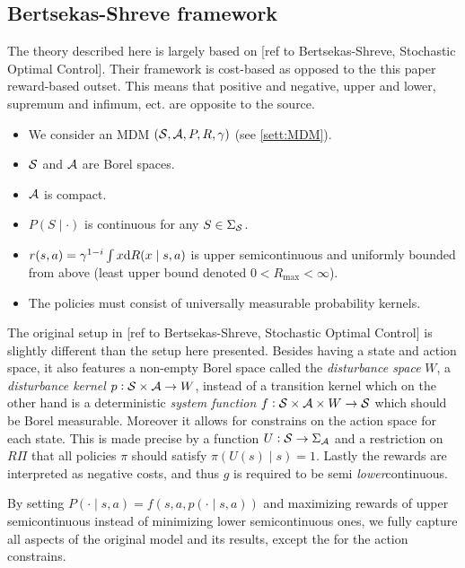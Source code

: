 \subsection{Bertsekas-Shreve framework}
The theory described here is largely based on
[ref to Bertsekas-Shreve, Stochastic Optimal Control].
Their framework is cost-based as opposed to the this paper reward-based outset.
This means that positive and negative, upper and lower, supremum and infimum,
ect. are opposite to the source.
\begin{sett}[BS]
  \begin{itemize}
    \item We consider an MDM $(\mathcal{S}, \mathcal{A}, P, R, \gamma)$
      (see \cref{sett:MDM}).
    \item $\mathcal{S}$ and $\mathcal{A}$ are Borel spaces.
    \item $\mathcal{A}$ is compact.
    \item $P(S \mid \cdot)$ is continuous for any $S \in \Sigma_{\mathcal{S}}$.
    \item $r(s,a) = \gamma^{1-i} \int x \mathrm{d} R(x \mid s, a)$ 
      is upper semicontinuous and uniformly bounded from above
      (least upper bound denoted $0 < R_{\max} < \infty$).
    \item The policies must consist of
      universally measurable probability kernels.
  \end{itemize}
  \label{sett:BS}
\end{sett}
The original setup in [ref to Bertsekas-Shreve, Stochastic Optimal Control]
is slightly different than the setup here presented.
Besides having a state and action space, it also features a 
non-empty Borel space called the
\emph{disturbance space} $W$, a \emph{disturbance kernel}
$p: \mathcal{S} \times \mathcal{A} \to W$,
instead of a transition kernel which on the other hand is a deterministic
\emph{system function} $f : \mathcal{S} \times \mathcal{A} \times W \to \mathcal{S}$
which should be Borel measurable.
Moreover it allows for constrains on the action space for each state.
This is made precise by a function $U:\mathcal{S} \to \Sigma_{\mathcal{A}}$
and a restriction on $R\Pi$ that all policies $\pi$ should satisfy
$\pi(U(s) \mid s) = 1$.
Lastly the rewards are interpreted as negative costs, and thus
$g$ is required to be semi \emph{lower}continuous.

By setting $P(\cdot \mid s, a) = f(s, a, p(\cdot \mid s, a))$
and maximizing rewards of upper semicontinuous instead of
minimizing lower semicontinuous ones, we fully capture
all aspects of the original model and its results,
except the for the action constrains. %

